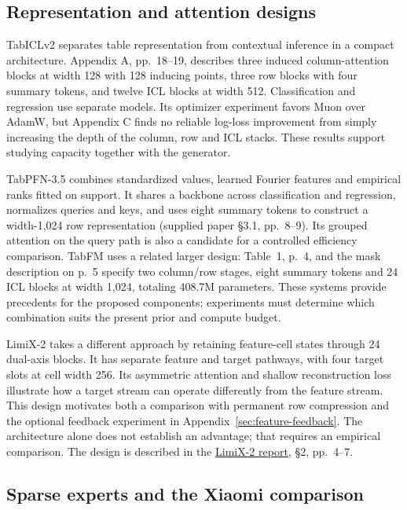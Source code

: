 \documentclass[11pt]{article}
\begin{document}
\subsection{Representation and attention designs}

TabICLv2 separates table representation from contextual inference in a compact architecture. Appendix A, pp.~18--19, describes three induced column-attention blocks at width 128 with 128 inducing points, three row blocks with four summary tokens, and twelve ICL blocks at width 512. Classification and regression use separate models. Its optimizer experiment favors Muon over AdamW, but Appendix C finds no reliable log-loss improvement from simply increasing the depth of the column, row and ICL stacks. These results support studying capacity together with the generator.

TabPFN-3.5 combines standardized values, learned Fourier features and empirical ranks fitted on support. It shares a backbone across classification and regression, normalizes queries and keys, and uses eight summary tokens to construct a width-1,024 row representation (supplied paper \S3.1, pp.~8--9). Its grouped attention on the query path is also a candidate for a controlled efficiency comparison. TabFM uses a related larger design: Table~1, p.~4, and the mask description on p.~5 specify two column/row stages, eight summary tokens and 24 ICL blocks at width 1,024, totaling 408.7M parameters. These systems provide precedents for the proposed components; experiments must determine which combination suits the present prior and compute budget.

LimiX-2 takes a different approach by retaining feature-cell states through 24 dual-axis blocks. It has separate feature and target pathways, with four target slots at cell width 256. Its asymmetric attention and shallow reconstruction loss illustrate how a target stream can operate differently from the feature stream. This design motivates both a comparison with permanent row compression and the optional feedback experiment in Appendix~\ref{sec:feature-feedback}. The architecture alone does not establish an advantage; that requires an empirical comparison. The design is described in the \href{https://arxiv.org/abs/2609.17488}{LimiX-2 report}, \S2, pp.~4--7.

\subsection{Sparse experts and the Xiaomi comparison}
\end{document}
